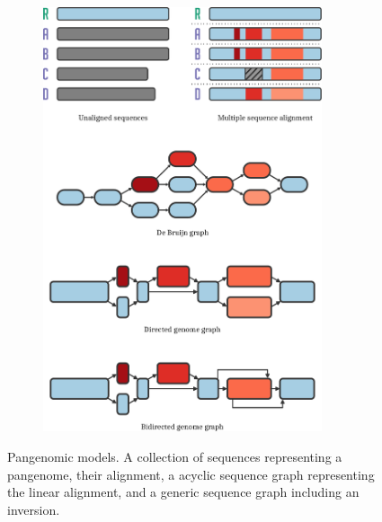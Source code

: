 \begin{figure}[p]
\begin{subfigure}[b]{0.5\textwidth}
    \includegraphics[width=0.9\textwidth]{figures/data_structures.pdf}
    \centering
  \end{subfigure}
  \label{fig:models}
  \caption{
    Pangenomic models.
      A collection of sequences representing a pangenome, their alignment, a acyclic sequence graph representing the linear alignment, and a generic sequence graph including an inversion.
  }

\end{figure}

